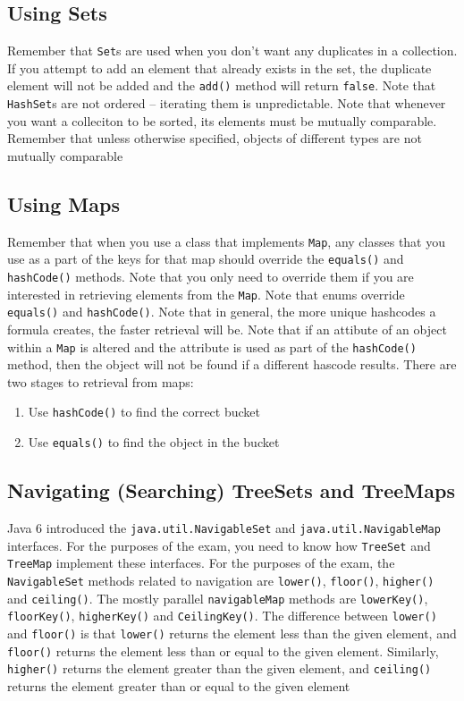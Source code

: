 \subsection{Using Sets}
Remember that \verb#Set#s are used when you don't want any duplicates in a 
collection. If you attempt to add an element that already exists in the set, 
the duplicate element will not be added and the \verb#add()# method will return 
\verb#false#. Note that \verb#HashSet#s are not ordered -- iterating them is 
unpredictable. Note that whenever you want a colleciton to be sorted, its 
elements must be mutually comparable. Remember that unless otherwise specified, 
objects of different types are not mutually comparable

\subsection{Using Maps}
Remember that when you use a class that implements \verb#Map#, any classes that 
you use as a part of the keys for that map should override the \verb#equals()# 
and \verb#hashCode()# methods. Note that you only need to override them if you 
are interested in retrieving elements from the \verb#Map#. Note that enums 
override \verb#equals()# and \verb#hashCode()#. Note that in general, the more 
unique hashcodes a formula creates, the faster retrieval will be. Note that if 
an attibute of an object within a \verb#Map# is altered and the attribute is 
used as part of the \verb#hashCode()# method, then the object will not be found 
if a different hascode results. There are two stages to retrieval from maps:
\begin{enumerate}
    \item Use \verb#hashCode()# to find the correct bucket
    \item Use \verb#equals()# to find the object in the bucket
\end{enumerate}

\subsection{Navigating (Searching) TreeSets and TreeMaps}
Java 6 introduced the \verb#java.util.NavigableSet# and 
\verb#java.util.NavigableMap# interfaces. For the purposes of the exam, you 
need to know how \verb#TreeSet# and \verb#TreeMap# implement these interfaces.  
For the purposes of the exam, the \verb#NavigableSet# methods related to 
navigation are \verb#lower()#, \verb#floor()#, \verb#higher()# and 
\verb#ceiling()#. The mostly parallel \verb#navigableMap# methods are 
\verb#lowerKey()#, \verb#floorKey()#, \verb#higherKey()# and 
\verb#CeilingKey()#. The difference between \verb#lower()# and \verb#floor()# 
is that \verb#lower()# returns the element less than the given element, and 
\verb#floor()# returns the element less than or equal to the given element.  
Similarly, \verb#higher()# returns the element greater than the given element, 
and \verb#ceiling()# returns the element greater than or equal to the given 
element


